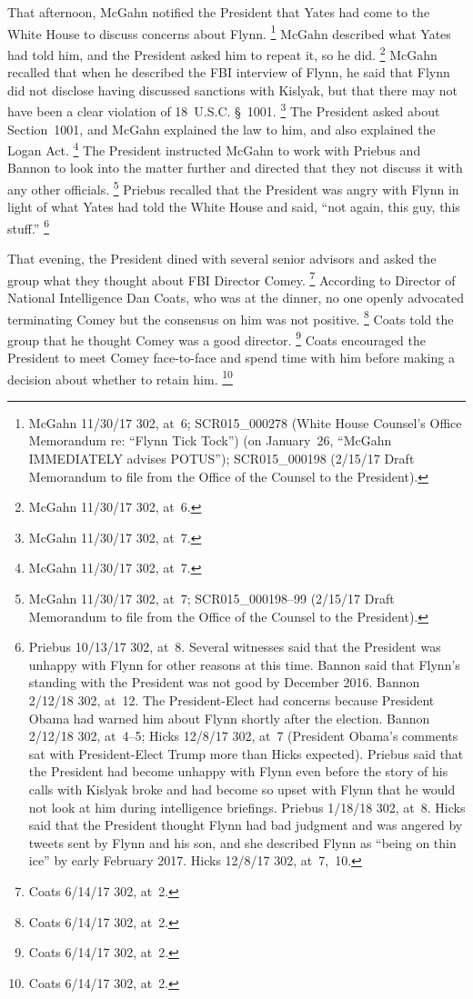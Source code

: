 That afternoon, McGahn notified the President that Yates had come to the White House to discuss concerns about Flynn.%
\footnote{McGahn 11/30/17 302, at~6;
SCR015\_000278 (White House Counsel's Office Memorandum re: ``Flynn Tick Tock'') (on January~26, ``McGahn IMMEDIATELY advises POTUS'');
SCR015\_000198 (2/15/17 Draft Memorandum to file from the Office of the Counsel to the President).}
McGahn described what Yates had told him, and the President asked him to repeat it, so he did.%
\footnote{McGahn 11/30/17 302, at~6.}
McGahn recalled that when he described the FBI interview of Flynn, he said that Flynn did not disclose having discussed sanctions with Kislyak, but that there may not have been a clear violation of 18~U.S.C. \S~1001.%
\footnote{McGahn 11/30/17 302, at~7.}
The President asked about Section~1001, and McGahn explained the law to him, and also explained the Logan Act.%
\footnote{McGahn 11/30/17 302, at~7.}
The President instructed McGahn to work with Priebus and Bannon to look into the matter further and directed that they not discuss it with any other officials.%
\footnote{McGahn 11/30/17 302, at~7;
SCR015\_000198--99 (2/15/17 Draft Memorandum to file from the Office of the Counsel to the President).}
Priebus recalled that the President was angry with Flynn in light of what Yates had told the White House and said, ``not again, this guy, this stuff.''%
\footnote{Priebus 10/13/17 302, at~8.
Several witnesses said that the President was unhappy with Flynn for other reasons at this time.
Bannon said that Flynn's standing with the President was not good by December 2016.
Bannon 2/12/18 302, at~12.
The President-Elect had concerns because President Obama had warned him about Flynn shortly after the election.
Bannon 2/12/18 302, at~4--5;
Hicks 12/8/17 302, at~7 (President Obama's comments sat with President-Elect Trump more than Hicks expected).
Priebus said that the President had become unhappy with Flynn even before the story of his calls with Kislyak broke and had become so upset with Flynn that he would not look at him during intelligence briefings.
Priebus 1/18/18 302, at~8.
Hicks said that the President thought Flynn had bad judgment and was angered by tweets sent by Flynn and his son, and she described Flynn as ``being on thin ice'' by early February 2017.
Hicks 12/8/17 302, at~7,~10.}

That evening, the President dined with several senior advisors and asked the group what they thought about FBI Director Comey.%
\footnote{Coats 6/14/17 302, at~2.}
According to Director of National Intelligence Dan Coats, who was at the dinner, no one openly advocated terminating Comey but the consensus on him was not positive.%
\footnote{Coats 6/14/17 302, at~2.}
Coats told the group that he thought Comey was a good director.%
\footnote{Coats 6/14/17 302, at~2.}
Coats encouraged the President to meet Comey face-to-face and spend time with him before making a decision about whether to retain him.%
\footnote{Coats 6/14/17 302, at~2.}

